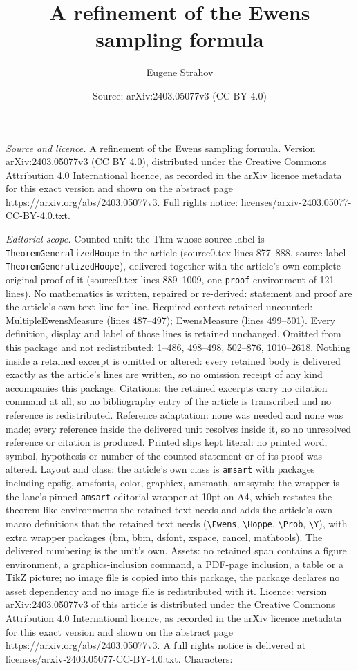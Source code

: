 \documentclass[10pt,a4paper]{amsart}
\title[A refinement of the Ewens sampling formula]{A refinement of the Ewens sampling formula}
\author{Eugene Strahov}
\date{Source: arXiv:2403.05077v3 (CC BY 4.0)}
\begin{document}
\maketitle

\noindent\emph{Source and licence.} A refinement of the Ewens sampling formula. Version arXiv:2403.05077v3 (CC BY 4.0), distributed under the Creative Commons Attribution 4.0 International licence, as recorded in the arXiv licence metadata for this exact version and shown on the abstract page https://arxiv.org/abs/2403.05077v3. Full rights notice: licenses/arxiv-2403.05077-CC-BY-4.0.txt.\par\smallskip

\noindent\textit{Editorial scope.} Counted unit: the Thm whose source label is \texttt{TheoremGeneralizedHoope} in the article (source0.tex lines 877--888, source label \texttt{TheoremGeneralizedHoope}), delivered together with the article's own complete original proof of it (source0.tex lines 889--1009, one \texttt{proof} environment of 121 lines). No mathematics is written, repaired or re-derived: statement and proof are the article's own text line for line. Required context retained uncounted: MultipleEwensMeasure (lines 487--497); EwensMeasure (lines 499--501). Every definition, display and label of those lines is retained unchanged. Omitted from this package and not redistributed: 1--486, 498--498, 502--876, 1010--2618. Nothing inside a retained excerpt is omitted or altered: every retained body is delivered exactly as the article's lines are written, so no omission receipt of any kind accompanies this package. Citations: the retained excerpts carry no citation command at all, so no bibliography entry of the article is transcribed and no reference is redistributed. Reference adaptation: none was needed and none was made; every reference inside the delivered unit resolves inside it, so no unresolved reference or citation is produced. Printed slips kept literal: no printed word, symbol, hypothesis or number of the counted statement or of its proof was altered. Layout and class: the article's own class is \texttt{amsart} with packages including epsfig, amsfonts, color, graphicx, amsmath, amssymb; the wrapper is the lane's pinned \texttt{amsart} editorial wrapper at 10pt on A4, which restates the theorem-like environments the retained text needs and adds the article's own macro definitions that the retained text needs (\texttt{\textbackslash Ewens}, \texttt{\textbackslash Hoppe}, \texttt{\textbackslash Prob}, \texttt{\textbackslash Y}), with extra wrapper packages (bm, bbm, dsfont, xspace, cancel, mathtools). The delivered numbering is the unit's own. Assets: no retained span contains a figure environment, a graphics-inclusion command, a PDF-page inclusion, a table or a TikZ picture; no image file is copied into this package, the package declares no asset dependency and no image file is redistributed with it. Licence: version arXiv:2403.05077v3 of this article is distributed under the Creative Commons Attribution 4.0 International licence, as recorded in the arXiv licence metadata for this exact version and shown on the abstract page https://arxiv.org/abs/2403.05077v3. A full rights notice is delivered at licenses/arxiv-2403.05077-CC-BY-4.0.txt. Characters: 
\end{document}
